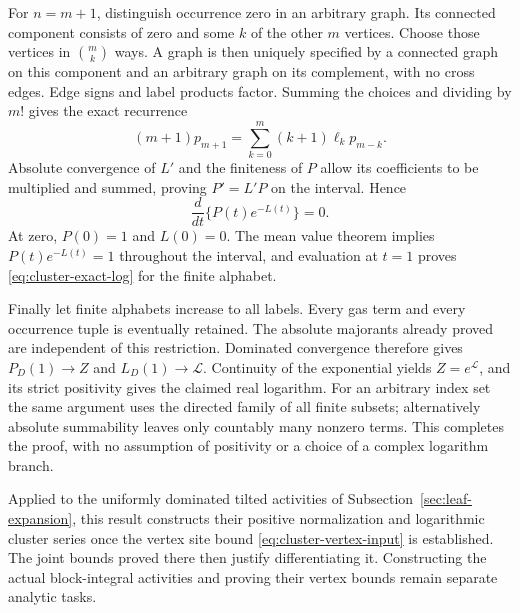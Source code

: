 For $n=m+1$, distinguish occurrence zero in an arbitrary graph. Its
connected component consists of zero and some $k$ of the other $m$
vertices. Choose those vertices in $\binom{m}{k}$ ways. A graph is
then uniquely specified by a connected graph on this component and
an arbitrary graph on its complement, with no cross edges. Edge
signs and label products factor. Summing the choices and dividing
by $m!$ gives the exact recurrence
\[
                  (m+1)p_{m+1}
                       =\sum_{k=0}^m(k+1)\ell_k p_{m-k}.
\]
Absolute convergence of $L'$ and the finiteness of $P$ allow its
coefficients to be multiplied and summed, proving $P'=L'P$ on the
interval. Hence
\[
                 \frac{d}{dt}\{P(t)e^{-L(t)}\}=0.
\]
At zero, $P(0)=1$ and $L(0)=0$. The mean value theorem implies
$P(t)e^{-L(t)}=1$ throughout the interval, and evaluation at $t=1$
proves \eqref{eq:cluster-exact-log} for the finite alphabet.

Finally let finite alphabets increase to all labels. Every gas term
and every occurrence tuple is eventually retained. The absolute
majorants already proved are independent of this restriction.
Dominated convergence therefore gives $P_D(1)\to Z$ and
$L_D(1)\to\mathcal L$. Continuity of the exponential yields
$Z=e^{\mathcal L}$, and its strict positivity gives the claimed
real logarithm. For an arbitrary index set the same argument uses
the directed family of all finite subsets; alternatively absolute
summability leaves only countably many nonzero terms. This completes
the proof, with no assumption of positivity or a choice of a complex
logarithm branch.

Applied to the uniformly dominated tilted activities of
Subsection~\ref{sec:leaf-expansion}, this result constructs their positive
normalization and logarithmic cluster series once the vertex site
bound \eqref{eq:cluster-vertex-input} is established. The joint bounds
proved there then justify differentiating it. Constructing the actual
block-integral activities and proving their vertex bounds remain
separate analytic tasks.
